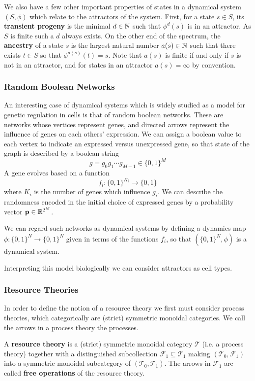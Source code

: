 We also have a few other important properties of states in a dynamical system $(S,\phi)$ which relate to the attractors of the system. First, for a state $s \in S$, its \textbf{transient progeny} is the minimal $d \in \mathbb N$ such that $\phi^d(s)$ is in an attractor. As $S$ is finite such a $d$ always exists. On the other end of the spectrum, the \textbf{ancestry} of a state $s$ is the largest natural number $a(s) \in \mathbb N$ such that there exists $t \in S$ so that $\phi^{a(s)}(t) =s$. Note that $a(s)$ is finite if and only if $s$ is not in an attractor, and for states in an attractor $a(s) = \infty$ by convention. 


\subsubsection{Random Boolean Networks}

An interesting case of dynamical systems which is widely studied as a model for genetic regulation in cells is that of random boolean networks. These are networks whose vertices represent genes, and directed arrows represent the influence of genes on each others' expression. We can assign a boolean value to each vertex to indicate an expressed versus unexpressed gene, so that state of the graph is described by a boolean string $$g = g_0g_1\cdots g_{M-1} \in \{0,1\}^M$$
A gene evolves based on a function $$f_i:\{0,1\}^{K_i}\rightarrow \{0,1\}$$
where $K_i$ is the number of genes which influence $g_i$. We can describe the randomness encoded in the initial choice of expressed genes by a probability vector $\mathbf{p} \in \mathbb R^{2^M}$. 


We can regard such networks as dynamical systems by defining a dynamics map $\phi:\{0,1\}^N\rightarrow \{0,1\}^N$ given in terms of the functions $f_i$, so that $(\{0,1\}^N,\phi)$ is a dynamical system. 


Interpreting this model biologically we can consider attractors as cell types.


\subsubsection{Resource Theories}

In order to define the notion of a resource theory we first must consider process theories, which categorically are (strict) symmetric monoidal categories. We call the arrows in a process theory the processes. 

\begin{defn}[label=defn:resourceTheory]
    A \textbf{resource theory} is a (strict) symmetric monoidal category $\mathcal{T}$ (i.e. a process theory) together with a distinguished subcollection $\mathcal{F}_1\subseteq \mathcal{T}_1$ making $(\mathcal{T}_0,\mathcal{F}_1)$ into a symmetric monoidal subcategory of $(\mathcal{T}_0,\mathcal{T}_1)$. The arrows in $\mathcal{F}_1$ are called \textbf{free operations} of the resource theory.
\end{defn}

